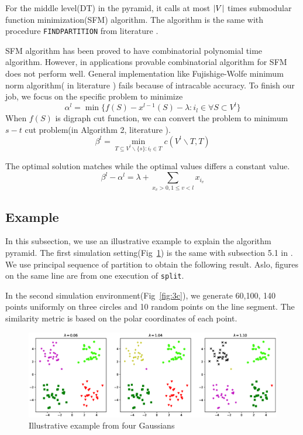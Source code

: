 \documentclass{article}
\DeclarePairedDelimiter\abs{\lvert}{\rvert}
\theoremstyle{definition}
\begin{document}
For the middle level(DT) in the pyramid, it calls at most $\abs{V}$ times submodular function minimization(SFM) algorithm.
The algorithm is the same with procedure \texttt{FINDPARTITION} from literature \cite{mac}.

SFM algorithm has been proved to have combinatorial polynomial time algorithm. However, in applications provable combinatorial algorithm for SFM does not perform well. General implementation like Fujishige-Wolfe minimum norm algorithm( in literature \cite{fwrobust}) fails because of intracable accuracy.
To finish our job, we focus on the specific problem to minimize 
\begin{equation}
\alpha^l = \min \{ f(S) - x^{l-1}(S) - \lambda: i_l \in \forall S \subset V^l\}
\end{equation}
When $f(S)$ is digraph cut function, we can convert the problem to minimum $s-t$ cut problem(in Algorithm 2, literature \cite{pin}). 
\begin{equation}
\beta^l = \min_{T \subseteq V^l \backslash \{s\}: i_l \in T} c(V^l \backslash T, T)
\end{equation} 

The optimal solution matches while the optimal values differs a constant value. 
\begin{equation}
\beta^l - \alpha^l = \lambda + \sum_{x_v>0, 1\leq v<l}x_{i_v}
\end{equation} 
\subsection{Example}

In this subsection, we use an illustrative example to explain the algorithm pyramid.
The first simulation setting(Fig~\ref{fig:4p}) is the same with subsection 5.1 in \cite{mac}.  We use principal sequence of partition to obtain the following result.
Aslo, figures on the same line are from one execution of \texttt{split}.

In the second simulation environment(Fig~\ref{fig:3c}), we generate 60,100, 140 points uniformly on three circles and 10 random points on the line segment. The similarity metric is based on the polar coordinates of each point.

\begin{figure}[!ht]
\includegraphics[width=12cm]{pic/4part.eps}
\caption{Illustrative example from four Gaussians}\label{fig:4p}
\end{figure}
\end{document}
